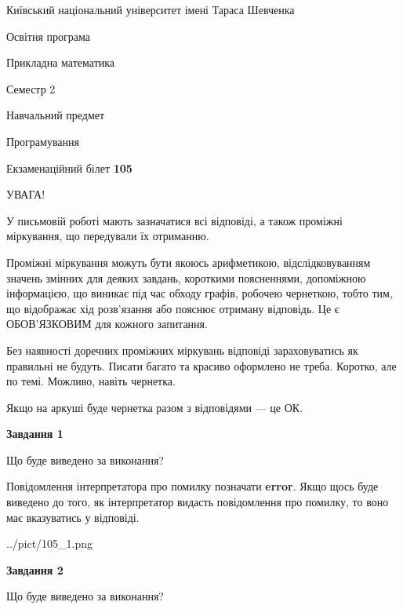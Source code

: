 \documentclass[12pt, ukrainian]{article}
\begin{document}
{{\begin {small}\par
{ \center  Київський національний університет імені Тараса Шевченка \par}
{\parbox {5 cm}{Освітня програма \hfill}{\parbox {7 cm}{Прикладна математика \hfill}}\parbox {6 cm}{\hfill Семестр 2}}\par
{\parbox {5 cm} {Навчальний предмет \hfill}\parbox {7 cm}{Програмування \hfill}\parbox {6cm}{\hfill}\par}\vspace{-7pt} \end{small}}{\center Екзаменаційний білет \No \textbf
{ 105 }\par}}
{
\begin {large}
УВАГА!

У письмовій роботі мають зазначатися всі відповіді, а також проміжні міркування, що передували їх отриманню.

Проміжні міркування можуть бути якоюсь арифметикою, відслідковуванням зна\-чень змінних для деяких завдань,
короткими поясненнями, допоміжною інформацією, що виникає під час обходу графів, робочею чернеткою,
тобто тим, що відображає хід розв’язання або пояснює отриману відповідь.
Це є ОБОВ’ЯЗКОВИМ для кожного запитання.

Без наявності доречних проміжних міркувань відповіді зараховуватись як правиль\-ні не будуть.
Писати багато та красиво оформлено не треба. Коротко, але по темі. Можли\-во, навіть чернетка.

Якщо на аркуші буде чернетка разом з відповідями --- це ОК.

\newpage

{\begin {center}\textbf{Завдання 1}\end {center}}\par
Що буде виведено за виконання?

Повідомлення інтерпретатора про помилку позначати \textbf{error}.
Якщо щось буде виведено до того, як інтерпретатор видасть повідомлення про помилку, 
то воно має вказуватись у відповіді. \par


\begin{center}
	{../pict/105_1.png}
\end{center}
\newpage

{\begin {center}\textbf{Завдання 2}\end {center}}\par
Що буде виведено за виконання?


\end{large}}
\end{document}
